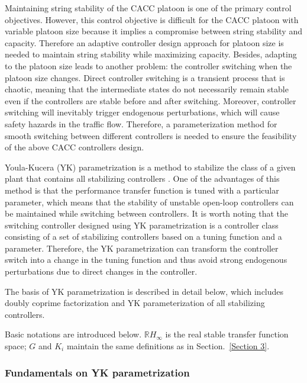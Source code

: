 \documentclass[journal]{IEEEtran}
\begin{document}
Maintaining string stability of the CACC platoon is one of the primary control objectives. However, this control objective is difficult for the CACC platoon with variable platoon size because it implies a compromise between string stability and capacity. Therefore an adaptive controller design approach for platoon size is needed to maintain string stability while maximizing capacity. Besides, adapting to the platoon size leads to another problem: the controller switching when the platoon size changes. Direct controller switching is a transient process that is chaotic, meaning that the intermediate states do not necessarily remain stable even if the controllers are stable before and after switching. Moreover, controller switching will inevitably trigger endogenous perturbations, which will cause safety hazards in the traffic flow. Therefore, a parameterization method for smooth switching between different controllers is needed to ensure the feasibility of the above CACC controllers design.

Youla-Kucera (YK) parametrization is a method to stabilize the class of a given plant that contains all stabilizing controllers \citep{dasgupta1996parametrization,navas2017youla}. One of the advantages of this method is that the performance transfer function is tuned with a particular parameter, which means that the stability of unstable open-loop controllers can be maintained while switching between controllers. It is worth noting that the switching controller designed using YK parametrization is a controller class consisting of a set of stabilizing controllers based on a tuning function and a parameter. Therefore, the YK parametrization can transform the controller switch into a change in the tuning function and thus avoid strong endogenous perturbations due to direct changes in the controller.

The basis of YK parametrization is described in detail below, which includes doubly coprime factorization and YK parameterization of all stabilizing controllers.

Basic notations are introduced below. $\mathbb{R} H_{\infty}$ is the real stable transfer function space; $G$ and $K_i$ maintain the same definitions as in Section.~\ref{Section 3}.

\subsubsection{Fundamentals on YK parametrization}
\label{Section 3.2.1}
~\\
\end{document}

